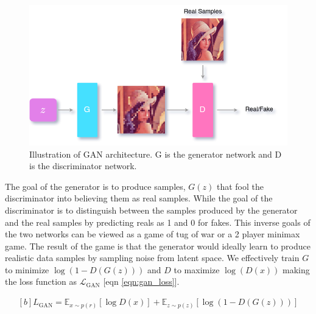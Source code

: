 \begin{figure}[!h]
    \centering
    \includegraphics[scale=0.4]{figures/gan_arch.png}
    \caption{Illustration of GAN architecture. G is the generator network and D is the discriminator network.}
    \label{fig:gan_arch}
\end{figure}

The goal of the generator is to produce samples, $G(z)$ that fool the discriminator into believing them as real samples. While the goal of the discriminator is to distinguish between the samples produced by the generator and the real samples by predicting reals as 1 and 0 for fakes. This inverse goals of the two networks can be viewed as a game of tug of war or a 2 player minimax game. The result of the game is that the generator would ideally learn to produce realistic data samples by sampling noise from latent space. We effectively train $G$ to minimize $\log(1-D(G({z})))$ and $D$ to maximize $\log(D(x))$ making the loss function as $\mathcal{L}_{\mathrm{GAN}}$ [eqn \ref{eqn:gan_loss}].

\begin{equation} \label{eqn:gan_loss}
    \begin{gathered}[b]
        {L}_{\mathrm{GAN}}=\mathbb{E}_{{x} \sim p({r})}[\log D({x})]+\mathbb{E}_{{z} \sim p({z})}[\log (1-D(G({z})))]
    \end{gathered}
\end{equation}

